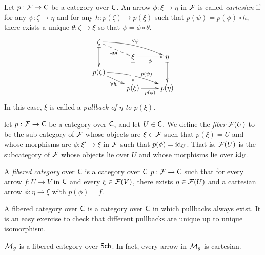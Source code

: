  \begin{definition}
   Let $p:\mathcal{F}\to \text{\sf C}$ be a category over $\text{\sf C}$. An arrow $\phi:\xi\to \eta$ in $\mathcal{F}$ is called
   \emph{cartesian} if for any $\psi:\zeta\to \eta$ and for any $h:p(\zeta)\to p(\xi)$
   such that $p(\psi)=p(\phi)\circ h$, there exists a unique $\theta:\zeta\to \xi$ so
   that $\psi=\phi\circ \theta$.
   \[\xymatrix@R-1.5pc{
    \zeta \ar@{|->}[dd]\ar@{-->}[dr]_{\exists! \theta} \ar@/^/[rrd]^{\forall \psi}\\
     & \xi\ar@{|->}[dd] \ar[r]_\phi & \eta \ar@{|->}[dd]\\
    p(\zeta) \ar[dr]_{\forall h} \ar@/^/[rrd]^(.65){p(\psi)}|!{[ru];[rd]}\hole \\
    & p(\xi) \ar[r]_{p(\phi)} & p(\eta)
   }\]
    In this case, $\xi$ is called a \emph{pullback of $\eta$ to $p(\xi)$}.
 \end{definition}
 \begin{definition}
   let $p:\mathcal{F}\to \text{\sf C}$ be a category over $\text{\sf C}$, and let $U\in \text{\sf C}$. We define the \emph{fiber}
   $\mathcal{F}(U)$ to be the sub-category of $\mathcal{F}$ whose objects are $\xi\in \mathcal{F}$ such that $p(\xi)=U$
   and whose morphisms are $\phi:\xi'\to \xi$ in $\mathcal{F}$ such that $p(\phi)=\operatorname{id}_U$. That is,
   $\mathcal{F}(U)$ is the subcategory of $\mathcal{F}$ whose objects lie over $U$ and whose morphisms lie
   over $\operatorname{id}_U$.
 \end{definition}
 \begin{definition}
   A \emph{fibered category} over $\text{\sf C}$ is a category over $\text{\sf C}$ $p:\mathcal{F}\to \text{\sf C}$ such that for
   every arrow $f:U\to V$ in $\text{\sf C}$ and every $\xi\in \mathcal{F}(V)$, there exists $\eta\in \mathcal{F}(U)$
   and a cartesian arrow $\phi:\eta\to \xi$ with $p(\phi)=f$.
 \end{definition}
 \begin{remark}
   A fibered category over $\text{\sf C}$ is a category over $\text{\sf C}$ in which pullbacks always exist.
   It is an easy exercise to check that different pullbacks are unique up to unique
   isomorphism.
 \end{remark}
 \begin{example}
   $\mathcal{M}_g$ is a fibered category over $\text{\sf Sch}$. In fact, every arrow in $\mathcal{M}_g$ is cartesian.
 \end{example}
